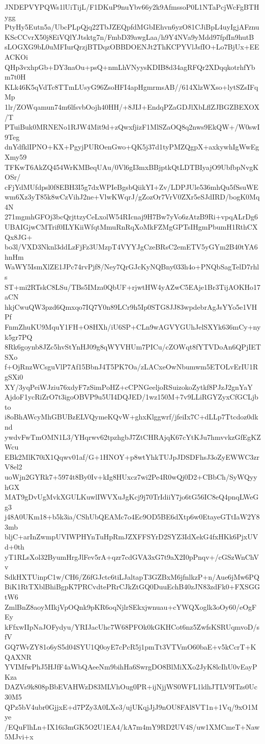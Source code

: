 JNDEPVYPQWs1lUiTijL/F1DKuP9nuYbv66y2k9AfmssoP0L1NTaPcjWcFgBTHygg
PtyHy5Eutn5a/UbcPLpQjq22TbJZEQpfdMGbIEhvn6yzO81CJiBpL4uyIgjAFznu
KScCCvrX50j8EiVQlYJtsktg7n/FmbD39awgLaa/h9Y4NVa9yMdd97fpfIn9hutB
sLOGXG9bL0uMFIurQrzjBTDqzOBBDOENJt2ThKCPYVlJsfIO+Lo7BjUx+EEACKOi
QHp3vxhpGb+DY3naOu+psQ+nmLhVNyysKDIB8d34agRFQr2XDqqkotrhfYbm7t0H
KLk46K5qVdTc8TTmLUsyG96ZsoHFI4apHgmrmsAB//614XlzWXso+lytSZsIFqMp
1lr/ZOWqamun74m6lfsvbOojh40HH/+8JIJ+EndqPZaGDJlXbLflZJBGZBEXOX/T
PTuiBuk0MRNENo1RJW4Mit9d+zQwxfjizF1MlSZaOQ8q2nws9EkQW+/W0swI9Teg
dnYdfklIPNO+KX+PgyjPUROenGwo+QK5j37d1tyPMZQgpX+axkywhIgWwEgXmy59
TFKwT6AkZQ454WrKMBeqUAu/0Vl6gI3mxBBjptkQtLDTBIyajO9UbfbpNvgKOSr/
cFjYdMUfdpsl0f8EBH3I5g7dxWPIeBgsbQiikYI+Zv/LDPJUle536mhQu5fSsuWE
wm6Xz3yT85k8wCzVihJ2ne+VlwKWqrJ/gZozOr7VrV0ZXr5eSJdIRD/bogK0Mq4N
271mgmhGFOj3bcQrjttzyCeLxolW54RIcnaj9H7Bw7yVo6zAtzB9Ri+vpqALrDg6
UBAIGjwCMTrif0ILYKiiWfqtMmuRnRqXoMkFZMgGPTsIHgmPbumH1RthCXQx8JG+
bo3l/VXD3Nknl3ddLzFjFz3UMzpT4VYYJgCzeBRsC2emETV5yGYm2B40tYA6hnHm
WaWY5IsmXlZE1JPc74rvPjf8/Ney7QrGJcKyNQBny033h4o+PNQbSagTelD7rhls
ST+mi2RTskC8LSu/TBs5IMza0QbUF+rjwtHW4yAZwC5EAje1Br3TijAOKHo17aCN
hkjCwuQW3pzd6Qmxqo7IQ7Y0n89LCr9h5Ip0STG8JJ83wpdebrAgJsYYo5e1VHPf
FnmZhuKU9MquY1FH+O8HXh/iU6SP+CLn9wAGVYGUhJelSXYk636mCy+nyk5gr7PQ
8Rk6goynb8JZc5hvStYnHJ09g8qWYVHUm7PICu/cZOWqt8fYTVDoAn6QPjIETSXo
f+OjRnzWCsguVlP7Af15BbnJ4T5PK7Oa/zLACxeOwNbumwm5ETOLvErIU1RgSXi0
XY/3yqPeiWJziu76xdyF7zSimPoHZ+cCPNGeeljoRSuizokoZytkf8PJzJ2gnYaY
AjdoF1ycRiZrO7t3igoOBVP9u5UI4DQJED/1wz150M+7v9LLiRGYZyxCfGCLjbto
i8oBhAWcyMhGBUBzELVQymeKQvW+ghxKlggwrf/jfeiIx7C+dLLp7Ttcdoz0dknd
ywdvFwTmOMN1L3/YHqrwv62tpzhgbJ7ZtCHRAjqK67cYtKJu7hmvvkzGfEgKZWcu
EBk2MlK70iX1Qqwv01af/G+1HNOY+p8wtYhkTUJpJDSDFhsJ3oZyEWWC3zrV8el2
uoWjn2GYRk7+5974t8By0Iv+kIg8HUxcz7wi2Pe4R0wQj0D2+CBbCh/SyWQyyhGX
MAT9gDvUgMvkXGULKuwlIWVXuJgKcj9j70TrIdiiY7jo6tG56IC8eQ4pnqLWeGg3
j48A0UKm18+b5k3ia/CShUbQEAMc7o4Ec9OD5BE6dXtp6w0EtayeGTtIaW2Y83mb
bljC+arInZwmpUVIWPHYnTuHpRmJZXFFSYrD2SYZ3IdXekG4fxHKk6PjxUVd+0th
yT1RLsXol32ByumHrgJlFev5rA+qzr7cdGVA3xG7t9aX2I0pPnqv+/cGSzWnChVv
SdkHXTUinpC1w/CH6/Z6fGJctc6tiLJaltapT3GZBxM6jfnlkzP+n/Aue6jMw6PQ
BiK1RtTXblBhiBgpK7PRCvdtePRrCJkZtGQ0DuuEchB40zJN83zdFk0+FXSGGtW6
ZmlBnZ8aoyMIkjVpOQnk9pKR6oqNjlrSEkxjwnuau+cYWQXoglk3oOy60/eOgFEy
kFfxwIIpNaJOFydyu/YRIJacUhc7W68PFOk0kGKHCot6nz5ZwfsKSRUqmvoD/sfV
GQ7WvZY81o6yS5d04SYU1Q0oyE7cPcR5j1pmTt3VTVmO60baE+v5kCcrT+KQAXNR
YVIMfwPhJ5HJfF4aWbQAeeNm9bihHa6SwrgDO8BlMiXXo2JyK8lcIhU0vEayPKza
DAZVs9k808pBbEVAHWzD83MLVhOug0PR+ijNjjWS0WFL1ldhJTLV9ITzs0Uc30M5
QPz5bV4ubr0GjjxE+d7PZy3A0LXe3/ujUKqjJjJ9nOU8FAl8VT1n+1Vq/9xO1Mye
/EQuFlhLn+IX16i3mGK5O2U1EA4/kA7m4mY9RD2UV4S/uw1XMCmeT+Naw5MJvi+x
